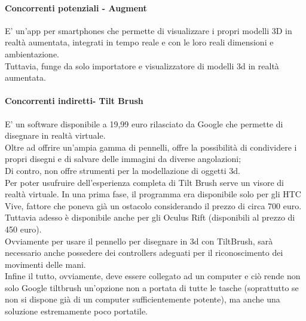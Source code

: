 \documentclass[11pt,fleqn]{book} %
\begin{document}
\paragraph{Concorrenti potenziali - Augment}
E' un'app per smartphones che permette di visualizzare i propri modelli 3D in realtà aumentata, integrati in tempo reale e con le loro reali dimensioni e ambientazione. \\
Tuttavia, funge da solo importatore e visualizzatore di modelli 3d in realtà aumentata.


\paragraph{Concorrenti indiretti- Tilt Brush}
E' un software disponibile a 19,99 euro rilasciato da Google che permette di disegnare in realtà virtuale. \\
Oltre ad offrire un'ampia gamma di pennelli, offre la possibilità di condividere i propri disegni e di salvare delle immagini da diverse angolazioni; \\Di contro, non offre strumenti per la modellazione di oggetti 3d.\\
Per poter usufruire dell'esperienza completa di Tilt Brush serve un visore di realtà virtuale. In una prima fase, il programma era disponibile solo per gli HTC Vive, fattore che poneva già un ostacolo considerando il prezzo di circa 700  euro. Tuttavia adesso è disponibile anche per gli Oculus Rift (disponibili al prezzo di 450 euro). \\
Ovviamente per usare il pennello per disegnare in 3d con TiltBrush, sarà necessario anche possedere dei controllers adeguati per il riconoscimento dei movimenti delle mani.\\
Infine il tutto, ovviamente, deve essere collegato ad un computer e ciò rende non solo Google tiltbrush un'opzione non a portata di tutte le tasche (soprattutto se non si dispone già di un computer sufficientemente potente), ma anche una soluzione estremamente poco portatile.\\
\end{document}
